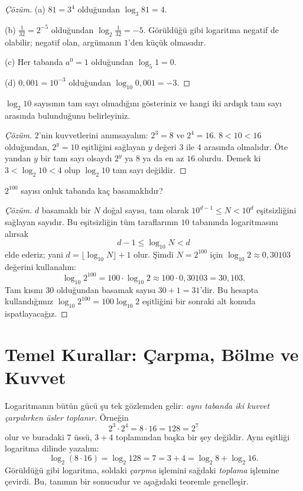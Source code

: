 \begin{proof}[Çözüm]
(a) $81 = 3^4$ olduğundan $\log_3 81 = 4$.

(b) $\frac{1}{32} = 2^{-5}$ olduğundan $\log_2 \frac{1}{32} = -5$. Görüldüğü gibi logaritma negatif de olabilir; negatif olan, argümanın $1$'den küçük olmasıdır.

(c) Her tabanda $a^0 = 1$ olduğundan $\log_5 1 = 0$.

(d) $0{,}001 = 10^{-3}$ olduğundan $\log_{10} 0{,}001 = -3$.
\end{proof}

\begin{example}
$\log_2 10$ sayısının tam sayı olmadığını gösteriniz ve hangi iki ardışık tam sayı arasında bulunduğunu belirleyiniz.
\end{example}

\begin{proof}[Çözüm]
$2$'nin kuvvetlerini anımsayalım: $2^3 = 8$ ve $2^4 = 16$. $8 < 10 < 16$ olduğundan, $2^y = 10$ eşitliğini sağlayan $y$ değeri $3$ ile $4$ arasında olmalıdır. Öte yandan $y$ bir tam sayı olsaydı $2^y$ ya $8$ ya da en az $16$ olurdu. Demek ki $3 < \log_2 10 < 4$ olup $\log_2 10$ tam sayı değildir.
\end{proof}

\begin{example}
$2^{100}$ sayısı onluk tabanda kaç basamaklıdır?
\end{example}

\begin{proof}[Çözüm]
$d$ basamaklı bir $N$ doğal sayısı, tam olarak $10^{d-1} \le N < 10^d$ eşitsizliğini sağlayan sayıdır. Bu eşitsizliğin tüm taraflarının $10$ tabanında logaritmasını alırsak
\[
d - 1 \le \log_{10} N < d
\]
elde ederiz; yani $d = \lfloor \log_{10} N \rfloor + 1$ olur. Şimdi $N = 2^{100}$ için $\log_{10} 2 \approx 0{,}30103$ değerini kullanalım:
\[
\log_{10} 2^{100} = 100 \cdot \log_{10} 2 \approx 100 \cdot 0{,}30103 = 30{,}103.
\]
Tam kısmı $30$ olduğundan basamak sayısı $30 + 1 = 31$'dir. Bu hesapta kullandığımız $\log_{10} 2^{100} = 100 \log_{10} 2$ eşitliğini bir sonraki alt konuda ispatlayacağız.
\end{proof}

\section{Temel Kurallar: Çarpma, Bölme ve Kuvvet}

Logaritmanın bütün gücü şu tek gözlemden gelir: \emph{aynı tabanda iki kuvvet çarpılırken üsler toplanır.} Örneğin
\[
2^3 \cdot 2^4 = 8 \cdot 16 = 128 = 2^7
\]
olur ve buradaki $7$ üssü, $3 + 4$ toplamından başka bir şey değildir. Aynı eşitliği logaritma dilinde yazalım:
\[
\log_2 (8 \cdot 16) = \log_2 128 = 7 = 3 + 4 = \log_2 8 + \log_2 16.
\]
Görüldüğü gibi logaritma, soldaki \emph{çarpma} işlemini sağdaki \emph{toplama} işlemine çevirdi. Bu, tanımın bir sonucudur ve aşağıdaki teoremle genelleşir.

